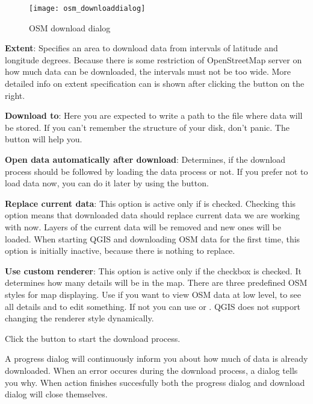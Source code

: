 \begin{figure}[ht]
   \centering
   \texttt{[image: osm\_downloaddialog]}
   \caption{OSM download dialog \nixcaption}\label{fig:osmdownload}
\end{figure}

\begin{description}
\item \textbf{Extent}: Specifies an area to download data from intervals 
of latitude and longitude degrees. Because there is some restriction of 
OpenStreetMap server on how much data can be downloaded, the intervals 
must not be too wide. More detailed info on extent specification can is 
shown after clicking the  button on 
the right.
\item \textbf{Download to}: Here you are expected to write a path to the 
file where data will be stored. If you can't remember the structure of 
your disk, don't panic. The  button will help you.
\item \textbf{Open data automatically after download}: Determines, if the 
download process should be followed by loading the data process or not. If you 
prefer not to load data now, you can do it later by using 
the  button.
\item \textbf{Replace current data}: This option is active only if 
 is checked. 
Checking this option means that downloaded data should replace
current data we are working with now. Layers of the current data will be 
removed and new ones will be loaded. When starting QGIS and downloading 
OSM data for the first time, this option is initially inactive, because 
there is nothing to replace.
\item \textbf{Use custom renderer}: This option is active only if the 
 checkbox is checked. 
It determines how many details will be in the map. There are three predefined 
OSM styles for map displaying. Use  if you want to view 
OSM data at low level, to see all details and to edit something. If not you 
can use  or . QGIS \CURRENT does 
not support changing the renderer style dynamically.
\end{description}

Click the  button to start the download process.

A progress dialog will continuously inform you about how much of data is
already downloaded. When an error occures during the download process, a 
dialog tells you why. When action finishes succesfully both the progress dialog
and download dialog will close themselves.

